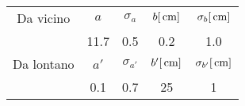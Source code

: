 \begin{tabulary}{\textwidth}{CCCCC}
\toprule
Da vicino & $a$ & $\sigma_a$ & $b [\,\mathrm{cm}]$ & $\sigma_b [\,\mathrm{cm}]$ \\ 
 & 11.7 & 0.5 & 0.2 & 1.0\\ \midrule
Da lontano & $a'$ & $\sigma_{a'}$ & $b' [\,\mathrm{cm}]$ & $\sigma_{b'} [\,\mathrm{cm}]$ \\ 
 & 0.1 & 0.7 & 25 & 1  \\
\bottomrule
\end{tabulary}
